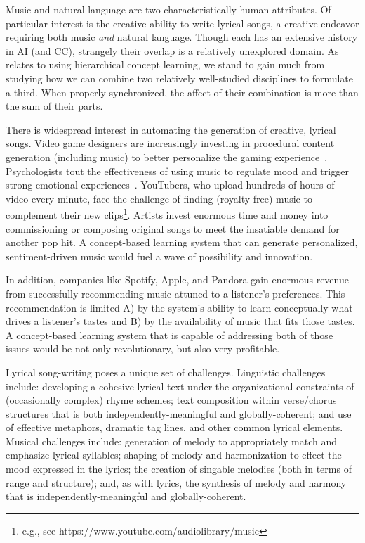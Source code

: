 \documentclass[11pt,phd]{byuprop}
\begin{document}

Music and natural language are two characteristically human attributes. Of particular interest is the creative ability to write lyrical songs, a creative endeavor requiring both music \emph{and} natural language. Though each has an extensive history in AI (and CC), strangely their overlap is a relatively unexplored domain. As relates to using hierarchical concept learning, we stand to gain much from studying how we can combine two relatively well-studied disciplines to formulate a third. When properly synchronized, the affect of their combination is more than the sum of their parts.

There is widespread interest in automating the generation of creative, lyrical songs. Video game designers are increasingly investing in procedural content generation (including music) to better personalize the gaming experience~\cite{togelius2011search,lebaron2015intelligent}. Psychologists tout the effectiveness of using music to regulate mood and trigger strong emotional experiences~\cite{gabrielsson2001emotions}. YouTubers, who upload hundreds of hours of video every minute, face the challenge of finding (royalty-free) music to complement their new clips\footnote{e.g., see https://www.youtube.com/audiolibrary/music}. Artists invest enormous time and money into commissioning or composing original songs to meet the insatiable demand for another pop hit. A concept-based learning system that can generate personalized, sentiment-driven music would fuel a wave of possibility and innovation.

In addition, companies like Spotify, Apple, and Pandora gain enormous revenue from successfully recommending music attuned to a listener's preferences. This recommendation is limited A) by the system's ability to learn conceptually what drives a listener's tastes and B) by the availability of music that fits those tastes. A concept-based learning system that is capable of addressing both of those issues would be not only revolutionary, but also very profitable.

Lyrical song-writing poses a unique set of challenges. Linguistic challenges include: developing a cohesive lyrical text under the organizational constraints of (occasionally complex) rhyme schemes; text composition within verse/chorus structures that is both independently-meaningful and globally-coherent; and use of effective metaphors, dramatic tag lines, and other common lyrical elements. Musical challenges include: generation of melody to appropriately match and emphasize lyrical syllables; shaping of melody and harmonization to effect the mood expressed in the lyrics; the creation of singable melodies (both in terms of range and structure); and, as with lyrics, the synthesis of melody and harmony that is independently-meaningful and globally-coherent.
\end{document}
